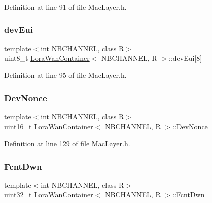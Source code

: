 Definition at line 91 of file Mac\+Layer.\+h.

\mbox{\label{class_lora_wan_container_ad4daef996cdb75fe3b0d33076b73dd2f}} 
\subsubsection{\texorpdfstring{dev\+Eui}{devEui}}
{\footnotesize\ttfamily template$<$int N\+B\+C\+H\+A\+N\+N\+EL, class R$>$ \\
uint8\+\_\+t \mbox{\hyperlink{class_lora_wan_container}{Lora\+Wan\+Container}}$<$ N\+B\+C\+H\+A\+N\+N\+EL, R $>$\+::dev\+Eui\mbox{[}8\mbox{]}}



Definition at line 95 of file Mac\+Layer.\+h.

\mbox{\label{class_lora_wan_container_a690b98b15d06ffcd16dc09aeacba25fc}} 
\subsubsection{\texorpdfstring{Dev\+Nonce}{DevNonce}}
{\footnotesize\ttfamily template$<$int N\+B\+C\+H\+A\+N\+N\+EL, class R$>$ \\
uint16\+\_\+t \mbox{\hyperlink{class_lora_wan_container}{Lora\+Wan\+Container}}$<$ N\+B\+C\+H\+A\+N\+N\+EL, R $>$\+::Dev\+Nonce}



Definition at line 129 of file Mac\+Layer.\+h.

\mbox{\label{class_lora_wan_container_aab64c8697dcf132852ff7f326f2a806a}} 
\subsubsection{\texorpdfstring{Fcnt\+Dwn}{FcntDwn}}
{\footnotesize\ttfamily template$<$int N\+B\+C\+H\+A\+N\+N\+EL, class R$>$ \\
uint32\+\_\+t \mbox{\hyperlink{class_lora_wan_container}{Lora\+Wan\+Container}}$<$ N\+B\+C\+H\+A\+N\+N\+EL, R $>$\+::Fcnt\+Dwn}



